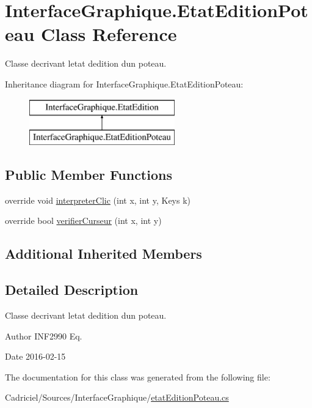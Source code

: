 \hypertarget{class_interface_graphique_1_1_etat_edition_poteau}{}\section{Interface\+Graphique.\+Etat\+Edition\+Poteau Class Reference}
\label{class_interface_graphique_1_1_etat_edition_poteau}


Classe decrivant l\textquotesingle{}etat d\textquotesingle{}edition d\textquotesingle{}un poteau.  


Inheritance diagram for Interface\+Graphique.\+Etat\+Edition\+Poteau\+:\begin{figure}[H]
\begin{center}
\leavevmode
\includegraphics[height=2.000000cm]{class_interface_graphique_1_1_etat_edition_poteau}
\end{center}
\end{figure}
\subsection*{Public Member Functions}
\begin{DoxyCompactItemize}
\item 
override void \hyperlink{group__inf2990_ga02ab06168c741d02e3ff643247aba300}{interpreter\+Clic} (int x, int y, Keys k)
\item 
override bool \hyperlink{group__inf2990_ga33eb3ed5dafa95a279263753cd7a4459}{verifier\+Curseur} (int x, int y)
\end{DoxyCompactItemize}
\subsection*{Additional Inherited Members}


\subsection{Detailed Description}
Classe decrivant l\textquotesingle{}etat d\textquotesingle{}edition d\textquotesingle{}un poteau. 

\begin{DoxyAuthor}{Author}
I\+N\+F2990 Eq. 
\end{DoxyAuthor}
\begin{DoxyDate}{Date}
2016-\/02-\/15 
\end{DoxyDate}


The documentation for this class was generated from the following file\+:\begin{DoxyCompactItemize}
\item 
Cadriciel/\+Sources/\+Interface\+Graphique/\hyperlink{etat_edition_poteau_8cs}{etat\+Edition\+Poteau.\+cs}\end{DoxyCompactItemize}
